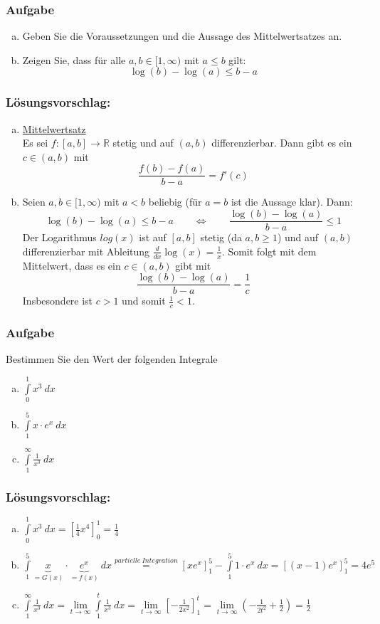 \documentclass[a4paper,11pt]{scrartcl}
\newcounter{auf}
\newcommand{\Aufgabe}%
        {\addtocounter{auf}{1} \subsubsection*{\rmfamily  Aufgabe \theauf \hspace{1em}} }
\newcommand{\RR}{\mathbb{R}}
\begin{document}
\newpage
\Aufgabe

\begin{enumerate}[a)]

\item Geben Sie die Voraussetzungen und die Aussage des Mittelwertsatzes an.
\item Zeigen Sie, dass für alle $a,b \in [1,\infty)$ mit $a\le b$ gilt:
$$
\log(b)-\log(a) \le b-a
$$
\end{enumerate}

\subsubsection*{Lösungsvorschlag:}
\begin{enumerate}[a)]
\item \underline{Mittelwertsatz}\\ Es sei $f:[a,b] \to \RR$ stetig und auf $(a,b)$ differenzierbar. Dann gibt es ein $c \in (a,b)$ mit
$$
\frac{f(b)-f(a)}{b-a}=f'(c)
$$
\item  Seien $a,b \in [1,\infty)$ mit $a< b$ beliebig (für $a=b$ ist die Aussage klar). Dann:
	$$
	\log(b)-\log(a) \le b-a \qquad \Longleftrightarrow \qquad \frac{\log(b)-\log(a)}{b-a} \le 1
	$$
	Der Logarithmus $log(x)$ ist auf $[a,b]$ stetig (da $a,b \ge 1$) und auf $(a,b)$ differenzierbar mit Ableitung $\frac{d}{dx}\log(x)=\frac{1}{x}$. Somit folgt mit dem Mittelwert, dass es ein $c\in (a,b)$ gibt mit 
		$$
		 \frac{\log(b)-\log(a)}{b-a} = \frac{1}{c}
	$$
Insbesondere ist $c>1$ und somit $ \frac{1}{c} < 1$.
\end{enumerate}

\newpage
\Aufgabe
Bestimmen Sie den Wert der folgenden Integrale
\begin{enumerate}[a)]
\item $\displaystyle\int \limits_{0}^1 x^3\ dx$
\item $\displaystyle\int \limits_{1}^5 x\cdot e^x \ dx$
\item $\displaystyle\int \limits_{1}^\infty \frac{1}{x^3}\ dx$
\end{enumerate}

\subsubsection*{Lösungsvorschlag:}

\begin{enumerate}[a)]
\item $\displaystyle\int \limits_{0}^1 x^3\ dx=\left[\frac{1}{4}x^4\right]_{0}^{1}=\frac{1}{4}$
\item $\displaystyle\int \limits_{1}^5 \underbrace{x}_{=G(x)}\cdot \underbrace{e^x}_{=f(x)} \ dx\stackrel{partielle \ Integration}{=} \left[xe^x\right]_1^5 - \displaystyle\int \limits_{1}^5 1\cdot e^x\ dx =[(x-1)e^x]_1^5=4e^5$
\item $\displaystyle\int \limits_{1}^\infty \frac{1}{x^3}\ dx = \lim \limits_{t \to \infty}\displaystyle\int \limits_{1}^t \frac{1}{x^3}\ dx = \lim \limits_{t \to \infty} \left[-\frac{1}{2x^2}\right]_1^t= \lim \limits_{t \to \infty} \left(-\frac{1}{2t^2}+\frac{1}{2}\right)=\frac{1}{2}$
\end{enumerate}
\end{document}
